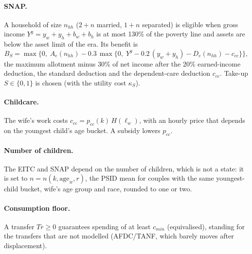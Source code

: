 \documentclass[11pt]{article}
\newcommand{\1}{\mathbf{1}}
\begin{document}
\paragraph{SNAP.} A household of size $n_{hh}$ ($2 + n$ married, $1 + n$ separated) is eligible when gross income
$Y^g = y_w + y_h + b_w + b_h$ is at most 130\% of the poverty line and assets are below the asset limit of the era. Its
benefit is
\[
  B_S = \max\big\{0,\; A_e(n_{hh}) - 0.3\,\max\{0,\; Y^g - 0.2\,(y_w + y_h) - D_e(n_{hh}) - c_{cc}\}\big\},
\]
the maximum allotment minus 30\% of net income after the 20\% earned-income deduction, the standard deduction and the
dependent-care deduction $c_{cc}$. Take-up $S \in \{0, 1\}$ is chosen (with the utility cost $\kappa_S$).

\paragraph{Childcare.} The wife's work costs $c_{cc} = p_{cc}(k)\, H(\ell_w)$, with an hourly price that depends on the
youngest child's age bucket. A subsidy lowers $p_{cc}$.

\paragraph{Number of children.} The EITC and SNAP depend on the number of children, which is not a state: it is set to
$n = n(k, \text{age}_w, r)$, the PSID mean for couples with the same youngest-child bucket, wife's age group and race,
rounded to one or two.

\paragraph{Consumption floor.} A transfer $Tr \ge 0$ guarantees spending of at least $c_{min}$ (equivalised), standing
for the transfers that are not modelled (AFDC/TANF, which barely moves after displacement).
\end{document}
